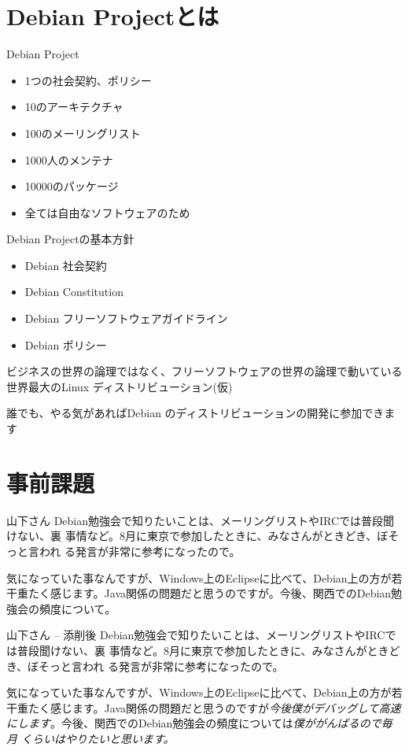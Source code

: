 \documentclass[cjk,dvipdfmx]{beamer}
\begin{document}
\section{Debian Projectとは}
\begin{frame}{Debian Project}
 \begin{itemize}%
  \item 1つの社会契約、ポリシー
  \item 10のアーキテクチャ
  \item 100のメーリングリスト
  \item 1000人のメンテナ
  \item 10000のパッケージ
  \item 全ては自由なソフトウェアのため
 \end{itemize}
\end{frame}

\begin{frame}{Debian Projectの基本方針}
 \begin{itemize}
  \item Debian 社会契約
  \item Debian Constitution
  \item Debian フリーソフトウェアガイドライン
  \item Debian ポリシー
 \end{itemize}

ビジネスの世界の論理ではなく、フリーソフトウェアの世界の論理で動いている
世界最大のLinux ディストリビューション(仮)

誰でも、やる気があればDebian のディストリビューションの開発に参加できま
す

\end{frame}

\section{事前課題}
\begin{frame}{山下さん}
Debian勉強会で知りたいことは、メーリングリストやIRCでは普段聞けない、裏
事情など。8月に東京で参加したときに、みなさんがときどき、ぼそっと言われ
る発言が非常に参考になったので。

気になっていた事なんですが、Windows上のEclipseに比べて、Debian上の方が若
干重たく感じます。Java関係の問題だと思うのですが。今後、関西でのDebian勉
強会の頻度について。
\end{frame}

\begin{frame}{山下さん -- 添削後}
Debian勉強会で知りたいことは、メーリングリストやIRCでは普段聞けない、裏
事情など。8月に東京で参加したときに、みなさんがときどき、ぼそっと言われ
る発言が非常に参考になったので。

気になっていた事なんですが、Windows上のEclipseに比べて、Debian上の方が若
干重たく感じます。Java関係の問題だと思うのですが{\em 今後僕がデバッグして高速
にします}。今後、関西でのDebian勉強会の頻度については{\em 僕ががんばるので毎月
 くらいはやりたいと思います。}
\end{frame}
\end{document}
